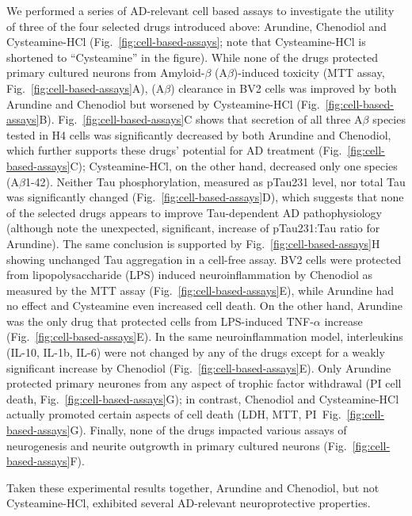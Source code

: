 \documentclass[letterpaper]{article}
\begin{document}
We performed a series of AD-relevant cell based assays to investigate the
utility of three of the four selected drugs introduced above: Arundine,
Chenodiol and Cysteamine-HCl (Fig.~\ref{fig:cell-based-assays}; note that
Cysteamine-HCl is shortened to ``Cysteamine'' in the figure).  While none of
the drugs protected primary cultured neurons from Amyloid-$\beta$
(A$\beta$)-induced toxicity (MTT assay, Fig.~\ref{fig:cell-based-assays}A),
(A$\beta$) clearance in BV2 cells was improved by both Arundine and Chenodiol
but worsened by Cysteamine-HCl (Fig.~\ref{fig:cell-based-assays}B).
Fig.~\ref{fig:cell-based-assays}C shows that secretion of all three A$\beta$
species tested in H4 cells was significantly decreased by both Arundine and
Chenodiol, which further supports these drugs' potential for AD treatment
(Fig.~\ref{fig:cell-based-assays}C); Cysteamine-HCl, on the other hand,
decreased only one species (A$\beta$1-42).  Neither Tau phosphorylation,
measured as pTau231 level, nor total Tau was significantly changed
(Fig.~\ref{fig:cell-based-assays}D), which suggests that none of the selected
drugs appears to improve Tau-dependent AD pathophysiology (although note the
unexpected, significant, increase of pTau231:Tau ratio for Arundine).  The
same conclusion is supported by Fig.~\ref{fig:cell-based-assays}H showing
unchanged Tau aggregation in a cell-free assay. BV2 cells were protected from
lipopolysaccharide (LPS) induced neuroinflammation by Chenodiol as measured by
the MTT assay (Fig.~\ref{fig:cell-based-assays}E), while Arundine had no
effect and Cysteamine even increased cell death.  On the other hand, Arundine
was the only drug that protected cells from LPS-induced TNF-$\alpha$ increase
(Fig.~\ref{fig:cell-based-assays}E).  In the same neuroinflammation model,
interleukins (IL-10, IL-1b, IL-6) were not changed by any of the drugs except
for a weakly significant increase by Chenodiol
(Fig.~\ref{fig:cell-based-assays}E).  Only Arundine protected primary neurones
from any aspect of trophic factor withdrawal (PI cell death,
Fig.~\ref{fig:cell-based-assays}G); in contrast, Chenodiol and Cysteamine-HCl
actually promoted certain aspects of cell death (LDH, MTT,
PI~Fig.~\ref{fig:cell-based-assays}G).  Finally, none of the drugs impacted
various assays of neurogenesis and neurite outgrowth in primary cultured
neurons (Fig.~\ref{fig:cell-based-assays}F).

Taken these experimental results together, Arundine and Chenodiol, but not
Cysteamine-HCl, exhibited several AD-relevant neuroprotective properties.
\end{document}
